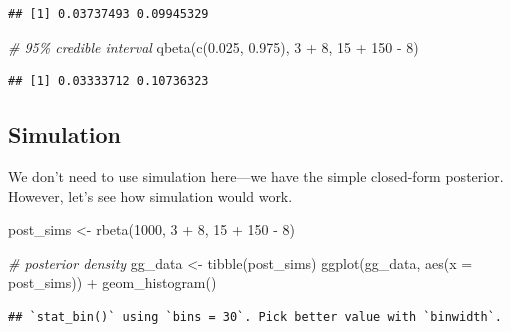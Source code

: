 \documentclass[
]{book}
\newenvironment{Shaded}{\begin{snugshade}}{\end{snugshade}}
\newcommand{\AttributeTok}[1]{\textcolor[rgb]{0.77,0.63,0.00}{#1}}
\newcommand{\CommentTok}[1]{\textcolor[rgb]{0.56,0.35,0.01}{\textit{#1}}}
\newcommand{\DecValTok}[1]{\textcolor[rgb]{0.00,0.00,0.81}{#1}}
\newcommand{\FloatTok}[1]{\textcolor[rgb]{0.00,0.00,0.81}{#1}}
\newcommand{\FunctionTok}[1]{\textcolor[rgb]{0.00,0.00,0.00}{#1}}
\newcommand{\NormalTok}[1]{#1}
\newcommand{\OtherTok}[1]{\textcolor[rgb]{0.56,0.35,0.01}{#1}}
\newcommand{\SpecialCharTok}[1]{\textcolor[rgb]{0.00,0.00,0.00}{#1}}
\begin{document}
\begin{verbatim}
## [1] 0.03737493 0.09945329
\end{verbatim}

\begin{Shaded}
\begin{Highlighting}[]
\CommentTok{\# 95\% credible interval}
\FunctionTok{qbeta}\NormalTok{(}\FunctionTok{c}\NormalTok{(}\FloatTok{0.025}\NormalTok{, }\FloatTok{0.975}\NormalTok{), }\DecValTok{3} \SpecialCharTok{+} \DecValTok{8}\NormalTok{, }\DecValTok{15} \SpecialCharTok{+} \DecValTok{150} \SpecialCharTok{{-}} \DecValTok{8}\NormalTok{)}
\end{Highlighting}
\end{Shaded}

\begin{verbatim}
## [1] 0.03333712 0.10736323
\end{verbatim}

\hypertarget{simulation}{%
\subsection{Simulation}\label{simulation}}

We don't need to use simulation here---we have the simple closed-form
posterior. However, let's see how simulation would work.

\begin{Shaded}
\begin{Highlighting}[]
\NormalTok{post\_sims }\OtherTok{\textless{}{-}} \FunctionTok{rbeta}\NormalTok{(}\DecValTok{1000}\NormalTok{, }\DecValTok{3} \SpecialCharTok{+} \DecValTok{8}\NormalTok{, }\DecValTok{15} \SpecialCharTok{+} \DecValTok{150} \SpecialCharTok{{-}} \DecValTok{8}\NormalTok{)}

\CommentTok{\# posterior density}
\NormalTok{gg\_data }\OtherTok{\textless{}{-}} \FunctionTok{tibble}\NormalTok{(post\_sims)}
\FunctionTok{ggplot}\NormalTok{(gg\_data, }\FunctionTok{aes}\NormalTok{(}\AttributeTok{x =}\NormalTok{ post\_sims)) }\SpecialCharTok{+} 
  \FunctionTok{geom\_histogram}\NormalTok{()}
\end{Highlighting}
\end{Shaded}

\begin{verbatim}
## `stat_bin()` using `bins = 30`. Pick better value with `binwidth`.
\end{verbatim}
\end{document}
